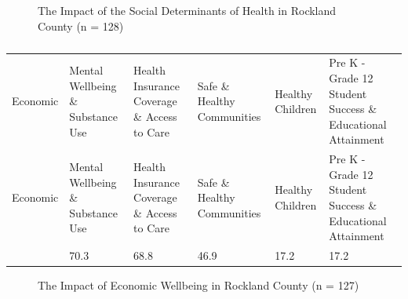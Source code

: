 \documentclass[
  english,
  letterpaper,
]{report}
\begin{document}
\begin{figure}


\caption{\label{fig-rc-impact-sdoh}The Impact of the Social Determinants
of Health in Rockland County (n = 128)}

\end{figure}%

\begin{longtable}[]{@{}llllll@{}}

\caption{\label{tbl-rc-impact-sdoh}The Impact of the Social Determinants
of Health in Rockland County (n = 128)}

\tabularnewline

\caption{}\label{T_23af5}\tabularnewline
\toprule\noalign{}
Economic & Mental Wellbeing \& Substance Use & Health Insurance Coverage
\& Access to Care & Safe \& Healthy Communities & Healthy Children & Pre
K - Grade 12 Student Success \& Educational Attainment \\
\midrule\noalign{}
\endfirsthead
\toprule\noalign{}
Economic & Mental Wellbeing \& Substance Use & Health Insurance Coverage
\& Access to Care & Safe \& Healthy Communities & Healthy Children & Pre
K - Grade 12 Student Success \& Educational Attainment \\
\midrule\noalign{}
\endhead
\bottomrule\noalign{}
\endlastfoot
79.7 & 70.3 & 68.8 & 46.9 & 17.2 & 17.2 \\

\end{longtable}

\begin{figure}


\caption{\label{fig-rc-impact-eco-wellbeing}The Impact of Economic
Wellbeing in Rockland County (n = 127)}

\end{figure}%
\end{document}
